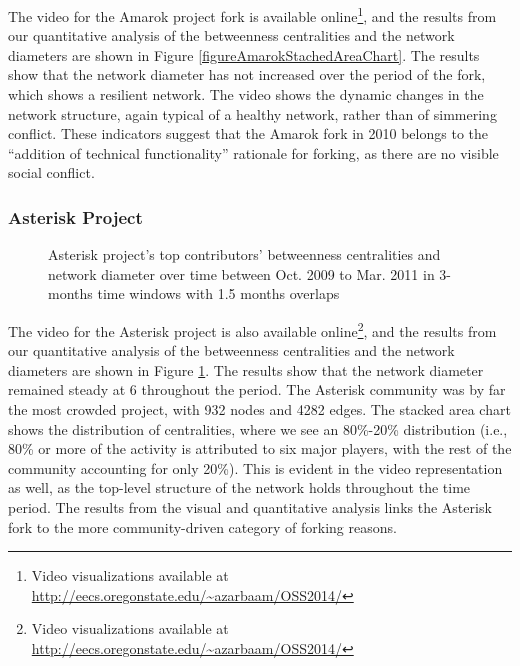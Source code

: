 \documentclass{acm_proc_article-sp}
\begin{document}
The video for the Amarok project fork is available online\footnote{Video visualizations available at \href{http://eecs.oregonstate.edu/~azarbaam/OSS2014/}{http://eecs.oregonstate.edu/\textasciitilde azarbaam/OSS2014/}}, and the results from our quantitative analysis of the betweenness centralities and the network diameters are shown in Figure \ref{figureAmarokStachedAreaChart}. The results show that the network diameter has not increased over the period of the fork, which shows a resilient network. The video shows the dynamic changes in the network structure, again typical of a healthy network, rather than of simmering conflict. These indicators suggest that the Amarok fork in 2010 belongs to the ``addition of technical functionality'' rationale for forking, as there are no visible social conflict.

\subsubsection{Asterisk Project}
\begin{figure}[!Ht]
\centering
{}
\justifying
{}
\caption{Asterisk project's top contributors' betweenness centralities and network diameter over time between Oct. 2009 to Mar. 2011 in 3-months time windows with 1.5 months overlaps}
\label{figureAsteriskStackedAreaChart}
\end{figure}

The video for the Asterisk project is also available online\footnote{Video visualizations available at \href{http://eecs.oregonstate.edu/~azarbaam/OSS2014/}{http://eecs.oregonstate.edu/\textasciitilde azarbaam/OSS2014/}}, and the results from our quantitative analysis of the betweenness centralities and the network diameters are shown in Figure \ref{figureAsteriskStackedAreaChart}. The results show that the network diameter remained steady at 6 throughout the period. The Asterisk community was by far the most crowded project, with 932 nodes and 4282 edges. The stacked area chart shows the distribution of centralities, where we see an 80\%-20\% distribution (i.e., 80\% or more of the activity is attributed to six major players, with the rest of the community accounting for only 20\%). This is evident in the video representation as well, as the top-level structure of the network holds throughout the time period. The results from the visual and quantitative analysis links the Asterisk fork to the more community-driven category of forking reasons.
\end{document}
